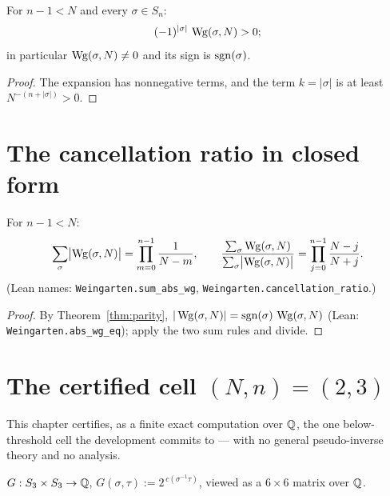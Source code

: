 \begin{theorem}\label{thm:parity}
\leanok
{}
For $n-1<N$ and every $\sigma\in S_n$:
\[
(-1)^{|\sigma|}\,\operatorname{Wg}(\sigma,N)>0;
\]
in particular $\operatorname{Wg}(\sigma,N)\neq0$ and its sign is $\operatorname{sgn}(\sigma)$.
\end{theorem}
\begin{proof}
\leanok
{}
The expansion has nonnegative terms, and the term $k=|\sigma|$ is at
least $N^{-(n+|\sigma|)}>0$.
\end{proof}

\chapter{The cancellation ratio in closed form}\label{ch:closed}

\begin{theorem}\label{thm:closed_form}
\leanok
{}
For $n-1<N$:
\[
\sum_{\sigma}\bigl|\operatorname{Wg}(\sigma,N)\bigr|=\prod_{m=0}^{n-1}\frac1{N-m},
\qquad
\frac{\sum_\sigma\operatorname{Wg}(\sigma,N)}{\sum_\sigma\bigl|\operatorname{Wg}(\sigma,N)\bigr|}
=\prod_{j=0}^{n-1}\frac{N-j}{N+j}.
\]
(Lean names: \texttt{Weingarten.sum\_abs\_wg},
\texttt{Weingarten.cancellation\_ratio}.)
\end{theorem}
\begin{proof}
\leanok
{}
By Theorem~\ref{thm:parity},
$|\operatorname{Wg}(\sigma,N)|=\operatorname{sgn}(\sigma)\,\operatorname{Wg}(\sigma,N)$ (Lean: \texttt{Weingarten.abs\_wg\_eq});
apply the two sum rules and divide.
\end{proof}

\chapter{The certified cell \texorpdfstring{$(N,n)=(2,3)$}{(N,n)=(2,3)}}\label{ch:cell}

This chapter certifies, as a finite exact computation over $\mathbb{Q}$, the
one below-threshold cell the development commits to --- with no general
pseudo-inverse theory and no analysis.

\begin{definition}\label{def:gram23}
\leanok
{}
$G:S_3\times S_3\to\mathbb{Q}$, $G(\sigma,\tau):=2^{\,c(\sigma^{-1}\tau)}$,
viewed as a $6\times6$ matrix over $\mathbb{Q}$.
\end{definition}

